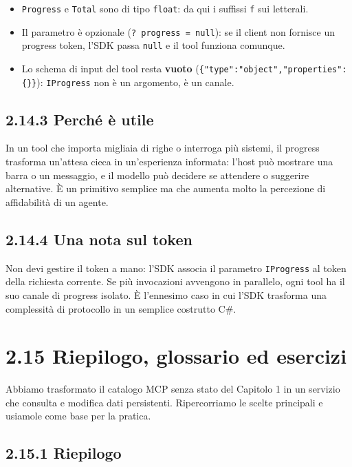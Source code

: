 \documentclass[
  italian,
  10pt,
]{book}
\providecommand{\tightlist}{%
  \setlength{\itemsep}{0pt}\setlength{\parskip}{0pt}}
\begin{document}
\begin{itemize}
\tightlist
\item
  \texttt{Progress} e \texttt{Total} sono di tipo \texttt{float}: da qui
  i suffissi \texttt{f} sui letterali.
\item
  Il parametro è opzionale (\texttt{?\ progress\ =\ null}): se il client
  non fornisce un progress token, l'SDK passa \texttt{null} e il tool
  funziona comunque.
\item
  Lo schema di input del tool resta \textbf{vuoto}
  (\texttt{\{"type":"object","properties":\{\}\}}): \texttt{IProgress}
  non è un argomento, è un canale.
\end{itemize}

\subsection{2.14.3 Perché è utile}\label{perchuxe9-uxe8-utile}

In un tool che importa migliaia di righe o interroga più sistemi, il
progress trasforma un'attesa cieca in un'esperienza informata: l'host
può mostrare una barra o un messaggio, e il modello può decidere se
attendere o suggerire alternative. È un primitivo semplice ma che
aumenta molto la percezione di affidabilità di un agente.

\subsection{2.14.4 Una nota sul token}\label{una-nota-sul-token}

Non devi gestire il token a mano: l'SDK associa il parametro
\texttt{IProgress} al token della richiesta corrente. Se più invocazioni
avvengono in parallelo, ogni tool ha il suo canale di progress isolato.
È l'ennesimo caso in cui l'SDK trasforma una complessità di protocollo
in un semplice costrutto C\#.

\section{2.15 Riepilogo, glossario ed
esercizi}\label{riepilogo-glossario-ed-esercizi}

Abbiamo trasformato il catalogo MCP senza stato del Capitolo 1 in un
servizio che consulta e modifica dati persistenti. Ripercorriamo le
scelte principali e usiamole come base per la pratica.

\subsection{2.15.1 Riepilogo}\label{riepilogo}
\end{document}
